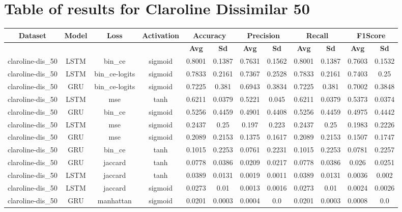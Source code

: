 \documentclass{article}%
\begin{document}
\section{Table of results for Claroline Dissimilar 50}%
\label{sec:TableofresultsforClarolineDissimilar50}%
\begin{tabular}{|c|c|c|c|c|c|c|c|c|c|c|c|}%
\hline%
\rowcolor{lightgray!70}%
\textbf{Dataset}&\textbf{Model}&\textbf{Loss}&\textbf{Activation}&\multicolumn{2}{c|}{\textbf{Accuracy}}&\multicolumn{2}{c|}{\textbf{Precision}}&\multicolumn{2}{c|}{\textbf{Recall}}&\multicolumn{2}{c|}{\textbf{F1Score}}\\%
\hline%
\rowcolor{lightgray!70}%
\textbf{}&\textbf{}&\textbf{}&\textbf{}&\textbf{Avg}&\textbf{Sd}&\textbf{Avg}&\textbf{Sd}&\textbf{Avg}&\textbf{Sd}&\textbf{Avg}&\textbf{Sd}\\%
\hline%
claroline{-}dis\_50&LSTM&bin\_ce&sigmoid&0.8001&0.1387&0.7631&0.1562&0.8001&0.1387&0.7603&0.1532\\%
\hline%
claroline{-}dis\_50&LSTM&bin\_ce{-}logits&sigmoid&0.7833&0.2161&0.7367&0.2528&0.7833&0.2161&0.7403&0.25\\%
\hline%
claroline{-}dis\_50&GRU&bin\_ce{-}logits&sigmoid&0.7225&0.381&0.6943&0.3834&0.7225&0.381&0.7002&0.3848\\%
\hline%
claroline{-}dis\_50&LSTM&mse&tanh&0.6211&0.0379&0.5221&0.045&0.6211&0.0379&0.5373&0.0374\\%
\hline%
claroline{-}dis\_50&GRU&bin\_ce&sigmoid&0.5256&0.4459&0.4901&0.4408&0.5256&0.4459&0.4975&0.4442\\%
\hline%
claroline{-}dis\_50&LSTM&mse&sigmoid&0.2437&0.25&0.197&0.223&0.2437&0.25&0.1983&0.2226\\%
\hline%
claroline{-}dis\_50&GRU&mse&sigmoid&0.2089&0.2153&0.1375&0.1617&0.2089&0.2153&0.1507&0.1747\\%
\hline%
claroline{-}dis\_50&GRU&bin\_ce&tanh&0.1015&0.2253&0.0761&0.2231&0.1015&0.2253&0.0781&0.2257\\%
\hline%
claroline{-}dis\_50&GRU&jaccard&tanh&0.0778&0.0386&0.0209&0.0217&0.0778&0.0386&0.026&0.0251\\%
\hline%
claroline{-}dis\_50&LSTM&jaccard&tanh&0.0389&0.0131&0.0019&0.0011&0.0389&0.0131&0.0036&0.002\\%
\hline%
claroline{-}dis\_50&LSTM&jaccard&sigmoid&0.0273&0.01&0.0013&0.0016&0.0273&0.01&0.0024&0.0026\\%
\hline%
claroline{-}dis\_50&GRU&manhattan&sigmoid&0.0201&0.0003&0.0004&0.0&0.0201&0.0003&0.0008&0.0\\%

\end{tabular}
\end{document}
